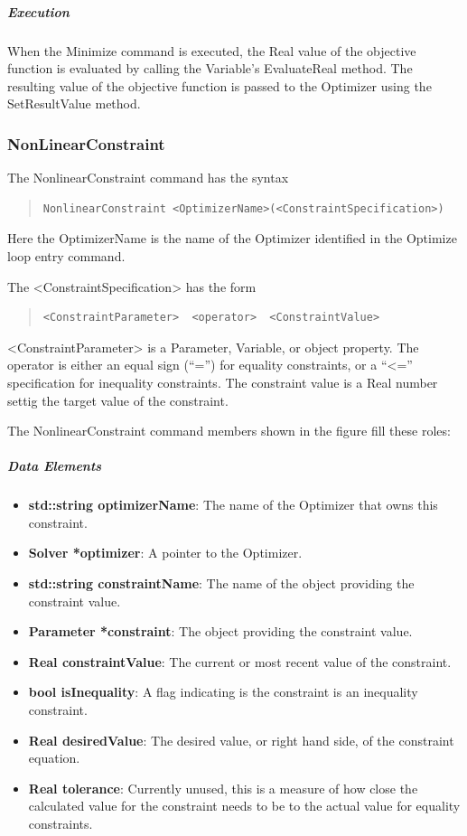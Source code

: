 \subparagraph{Execution}  When the Minimize command is executed, the Real value of the objective
function is evaluated by calling the Variable's EvaluateReal method.  The resulting value of the
objective function is passed to the Optimizer using the SetResultValue method.

\subsubsection{NonLinearConstraint}

The NonlinearConstraint command has the syntax

\begin{quote}
\begin{verbatim}
NonlinearConstraint <OptimizerName>(<ConstraintSpecification>)
\end{verbatim}
\end{quote}

\noindent Here the OptimizerName is the name of the Optimizer identified in the Optimize loop entry
command.

The <ConstraintSpecification> has the form

\begin{quote}
\begin{verbatim}
<ConstraintParameter>  <operator>  <ConstraintValue>
\end{verbatim}
\end{quote}

\noindent <ConstraintParameter> is a Parameter, Variable, or object property.  The operator is
either an equal sign (``='') for equality constraints, or a ``<='' specification for inequality
constraints.  The constraint value is a Real number settig the target value of the constraint.

The NonlinearConstraint command members shown in the figure fill these roles:

\subparagraph{Data Elements}

\begin{itemize}
\item \textbf{std::string optimizerName}: The name of the Optimizer that owns this constraint.
\item \textbf{Solver *optimizer}: A pointer to the Optimizer.
\item \textbf{std::string constraintName}: The name of the object providing the constraint value.
\item \textbf{Parameter *constraint}: The object providing the constraint value.
\item \textbf{Real constraintValue}: The current or most recent value of the constraint.
\item \textbf{bool isInequality}: A flag indicating is the constraint is an inequality constraint.
\item \textbf{Real desiredValue}: The desired value, or right hand side, of the constraint equation.
\item \textbf{Real tolerance}: Currently unused, this is a measure of how close the calculated
value for the constraint needs to be to the actual value for equality constraints.
\end{itemize}

